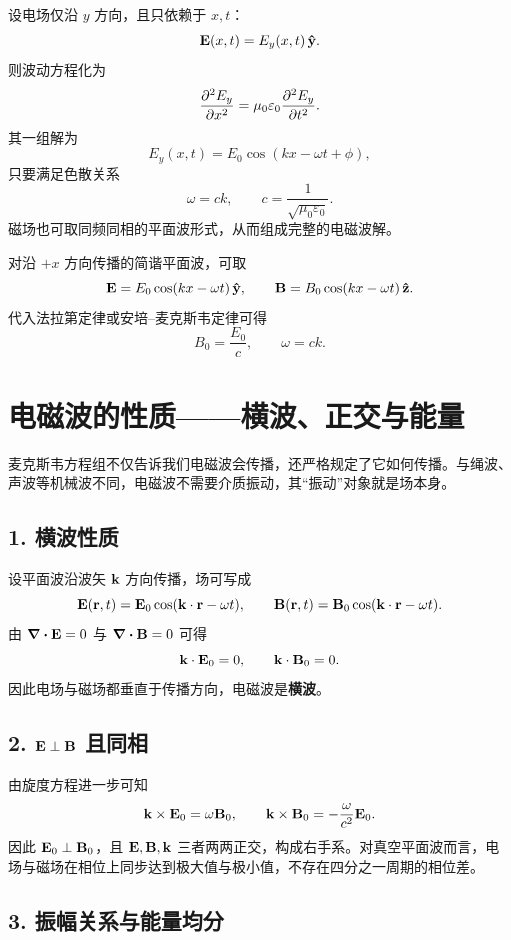 \begin{example}[一维平面电磁波满足波动方程]
设电场仅沿 $y$ 方向，且只依赖于 $x,t$：
\[
\vb{E}(x,t)=E_y(x,t)\,\vu{y}.
\]
则波动方程化为
\[
\pdv[2]{E_y}{x}=\mu_0\varepsilon_0\pdv[2]{E_y}{t}.
\]
其一组解为
\[
E_y(x,t)=E_0\cos(kx-\omega t+\phi),
\]
只要满足色散关系
\[
\omega=ck,\qquad c=\frac{1}{\sqrt{\mu_0\varepsilon_0}}.
\]
磁场也可取同频同相的平面波形式，从而组成完整的电磁波解。
\end{example}

\begin{law}[平面电磁波的场关系]
对沿 $+x$ 方向传播的简谐平面波，可取
\[
\vb{E}=E_0\cos(kx-\omega t)\,\vu{y},
\qquad
\vb{B}=B_0\cos(kx-\omega t)\,\vu{z}.
\]
代入法拉第定律或安培--麦克斯韦定律可得
\[
B_0=\frac{E_0}{c},
\qquad
\omega=ck.
\]
\end{law}

\section{电磁波的性质——横波、正交与能量}

麦克斯韦方程组不仅告诉我们电磁波会传播，还严格规定了它如何传播。与绳波、声波等机械波不同，电磁波不需要介质振动，其“振动”对象就是场本身。

\subsection*{1. 横波性质}

设平面波沿波矢 $\vb{k}$ 方向传播，场可写成
\[
\vb{E}(\vb{r},t)=\vb{E}_0\cos(\vb{k}\cdot\vb{r}-\omega t),
\qquad
\vb{B}(\vb{r},t)=\vb{B}_0\cos(\vb{k}\cdot\vb{r}-\omega t).
\]
由 $\div\vb{E}=0$ 与 $\div\vb{B}=0$ 可得
\[
\vb{k}\cdot\vb{E}_0=0,
\qquad
\vb{k}\cdot\vb{B}_0=0.
\]
因此电场与磁场都垂直于传播方向，电磁波是\textbf{横波}。

\subsection*{2. $\vb{E}\perp \vb{B}$ 且同相}

由旋度方程进一步可知
\[
\vb{k}\times \vb{E}_0=\omega \vb{B}_0,
\qquad
\vb{k}\times \vb{B}_0=-\frac{\omega}{c^2}\vb{E}_0.
\]
因此 $\vb{E}_0\perp \vb{B}_0$，且 $\vb{E},\vb{B},\vb{k}$ 三者两两正交，构成右手系。对真空平面波而言，电场与磁场在相位上同步达到极大值与极小值，不存在四分之一周期的相位差。

\subsection*{3. 振幅关系与能量均分}

